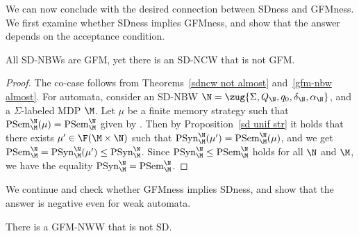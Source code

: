\documentclass{lmcs}
\begin{document}
We can now conclude with the desired connection between SDness and GFMness. 
We first examine whether SDness implies GFMness, and show that the answer depends on the acceptance condition.

\begin{thm}\label{sd-nbw gfm}
	All SD-NBWs are GFM, yet there is an SD-NCW that is not GFM. 
\end{thm}

\begin{proof}
The co-\buchi case follows from Theorems~\ref{sdncw not almost} and~\ref{gfm-nbw almost}. For \buchi automata, consider an SD-NBW $\N=\zug{\Sigma,Q_\N,q_0,\delta_\N,\alpha_\N}$, and a $\Sigma$-labeled MDP $\M$. Let $\mu$ be a finite memory strategy such that $\mathrm{PSem}^\N_\M(\mu)=\mathrm{PSem}^\N_\M$ given by \cite{CJH03}. Then by Proposition~\ref{sd unif str} it holds that there exists $\mu'\in \F(\M\times \N)$ such that $\mathrm{PSyn}^\N_\M(\mu')=\mathrm{PSem}^\N_\M(\mu)$, and we get $\mathrm{PSem}^\N_\M=\mathrm{PSyn}^\N_\M(\mu')\leq \mathrm{PSyn}^\N_\M$. Since $\mathrm{PSyn}^\N_\M\leq \mathrm{PSem}^\N_\M$ holds for all $\N$ and $\M$, we have the equality $\mathrm{PSyn}^\N_\M= \mathrm{PSem}^\N_\M$.
\end{proof}


We continue and check whether GFMness implies SDness, and show that the answer is negative even for weak automata.

\begin{thm}
	There is a GFM-NWW that is not SD.
\end{thm}
\end{document}
